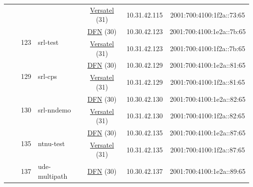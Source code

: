 \begin{small}
\begin{center}
\begin{longtable}{|c|c|c|c|c|c|c|c|}
  &  &  &  & \multicolumn{2}{|c|}{\tiny{\href{http://www.versatel.de}{Versatel} (31)}} & \tiny{10.31.42.115} & \tiny{2001:700:4100:1f2a::73:65} \\* \cline{3-3}\cline{4-4}\cline{5-5}\cline{6-6}\cline{7-7}\cline{8-8}
  &  & \multirow{2}{*}{\tiny{123}} & \multicolumn{1}{|l|}{\multirow{2}{*}{\tiny{srl-test}}} & \multicolumn{2}{|c|}{\tiny{\href{https://www.dfn.de}{DFN} (30)}} & \tiny{10.30.42.123} & \tiny{2001:700:4100:1e2a::7b:65} \\* \cline{5-5}\cline{6-6}\cline{7-7}\cline{8-8}
  &  &  &  & \multicolumn{2}{|c|}{\tiny{\href{http://www.versatel.de}{Versatel} (31)}} & \tiny{10.31.42.123} & \tiny{2001:700:4100:1f2a::7b:65} \\* \cline{3-3}\cline{4-4}\cline{5-5}\cline{6-6}\cline{7-7}\cline{8-8}
  &  & \multirow{2}{*}{\tiny{129}} & \multicolumn{1}{|l|}{\multirow{2}{*}{\tiny{srl-cps}}} & \multicolumn{2}{|c|}{\tiny{\href{https://www.dfn.de}{DFN} (30)}} & \tiny{10.30.42.129} & \tiny{2001:700:4100:1e2a::81:65} \\* \cline{5-5}\cline{6-6}\cline{7-7}\cline{8-8}
  &  &  &  & \multicolumn{2}{|c|}{\tiny{\href{http://www.versatel.de}{Versatel} (31)}} & \tiny{10.31.42.129} & \tiny{2001:700:4100:1f2a::81:65} \\* \cline{3-3}\cline{4-4}\cline{5-5}\cline{6-6}\cline{7-7}\cline{8-8}
  &  & \multirow{2}{*}{\tiny{130}} & \multicolumn{1}{|l|}{\multirow{2}{*}{\tiny{srl-nndemo}}} & \multicolumn{2}{|c|}{\tiny{\href{https://www.dfn.de}{DFN} (30)}} & \tiny{10.30.42.130} & \tiny{2001:700:4100:1e2a::82:65} \\* \cline{5-5}\cline{6-6}\cline{7-7}\cline{8-8}
  &  &  &  & \multicolumn{2}{|c|}{\tiny{\href{http://www.versatel.de}{Versatel} (31)}} & \tiny{10.31.42.130} & \tiny{2001:700:4100:1f2a::82:65} \\* \cline{3-3}\cline{4-4}\cline{5-5}\cline{6-6}\cline{7-7}\cline{8-8}
  &  & \multirow{2}{*}{\tiny{135}} & \multicolumn{1}{|l|}{\multirow{2}{*}{\tiny{ntnu-test}}} & \multicolumn{2}{|c|}{\tiny{\href{https://www.dfn.de}{DFN} (30)}} & \tiny{10.30.42.135} & \tiny{2001:700:4100:1e2a::87:65} \\* \cline{5-5}\cline{6-6}\cline{7-7}\cline{8-8}
  &  &  &  & \multicolumn{2}{|c|}{\tiny{\href{http://www.versatel.de}{Versatel} (31)}} & \tiny{10.31.42.135} & \tiny{2001:700:4100:1f2a::87:65} \\* \cline{3-3}\cline{4-4}\cline{5-5}\cline{6-6}\cline{7-7}\cline{8-8}
  &  & \multirow{2}{*}{\tiny{137}} & \multicolumn{1}{|l|}{\multirow{2}{*}{\tiny{ude-multipath}}} & \multicolumn{2}{|c|}{\tiny{\href{https://www.dfn.de}{DFN} (30)}} & \tiny{10.30.42.137} & \tiny{2001:700:4100:1e2a::89:65} \\* \cline{5-5}\cline{6-6}\cline{7-7}\cline{8-8}

\end{longtable}
\end{center}
\end{small}
